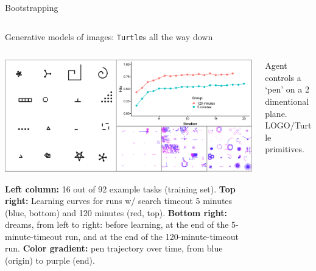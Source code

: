 \documentclass[final]{beamer}
\newlength{\onecolwid}
\newlength{\twocolwid}
\newlength{\threecolwid}
\newcommand{\system}{\textsc{DreamCoder}~}
\begin{document}
\begin{frame}[t]
\begin{columns}[t]
\begin{column}{\threecolwid}
\begin{columns}[t,totalwidth=\threecolwid]
\begin{column}{\threecolwid}
\begin{columns}[t,totalwidth=\threecolwid]
\begin{column}{\onecolwid}
\begin{block}{Bootstrapping}
  
\end{block}

\end{column}
\end{columns}

\begin{block}{Generative models of images: \texttt{Turtle}s all the way down}

\begin{columns}[t,totalwidth=\threecolwid] %

\begin{column}{\twocolwid} %
  
  \includegraphics[width=\twocolwid]{figures/dreams/montageLearningAndShapes.eps}

  \textbf{Left column:} 16 out of 92 example tasks %
 (training set). %
  \textbf{Top right:} Learning curves for  runs w/ search timeout
    5 minutes (blue, bottom) and  120 minutes (red, top). \textbf{Bottom right:}
   dreams, from left to right: before learning, at the end of the 5-minute-timeout run, and at the end of the
  120-minute-timeout run. \textbf{Color gradient:} pen trajectory over time,
  from blue (origin) to purple (end).

\end{column}
\begin{column}{\onecolwid} %
  Agent controls a `pen' on a 2 dimentional plane. LOGO/Turtle primitives.%


\end{column}
\end{columns}
\end{block}
\end{column}
\end{columns}
\end{column}
\end{columns}
\end{frame}
\end{document}
